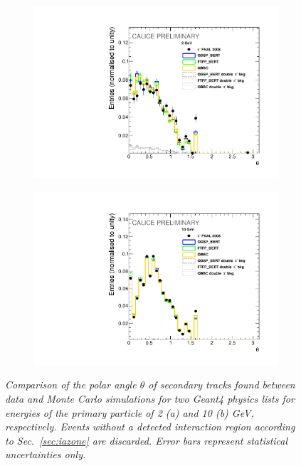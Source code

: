 \begin{figure}
	\centering
	\begin{subfigure}{0.5\textwidth}
		\centering
		\includegraphics[width=.90\linewidth]{ECAL/plots/theta-2.pdf}
		\caption{\label{fig:theta2} }
	\end{subfigure}%
	\begin{subfigure}{0.5\textwidth}
		\centering
		\includegraphics[width=.90\linewidth]{ECAL/plots/theta-10.pdf}
		\caption{\label{fig:theta10} }
	\end{subfigure}
	\caption{\label{fig:thetaexample} \sl Comparison of the polar angle $\theta$ of secondary tracks found between data and Monte Carlo simulations for two {\sc Geant}4 physics lists for energies of the primary particle of 2 (a) and 10 (b) GeV, respectively. Events without a detected interaction region according to Sec.~\ref{sec:iazone} are discarded. Error bars represent statistical uncertainties only.}
\end{figure}

